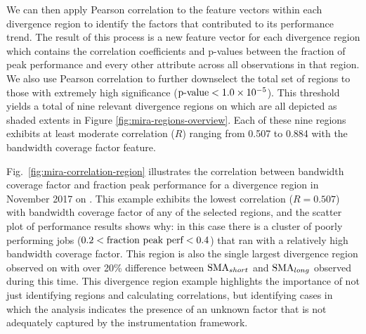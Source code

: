 We can then apply Pearson correlation to the feature vectors within
each divergence region to identify the factors that contributed to its
performance trend.  The result of this process is a new feature vector
for each divergence region which contains the correlation coefficients
and p-values between the fraction of peak performance and every other
attribute across all observations in that region.  We also use Pearson
correlation to further downselect the total set of regions to those 
with extremely high significance
($\textup{p-value} < {1.0 \times 10^{-5}}$).  This threshold yields a total
of nine relevant divergence regions on \mira \mirafsone which are all depicted as shaded extents in Figure \ref{fig:mira-regions-overview}.  Each of these nine
regions exhibits at least moderate correlation ($R$) ranging from 0.507 to
0.884 with the bandwidth coverage factor feature.


Fig.~\ref{fig:mira-correlation-region} illustrates the correlation
between bandwidth coverage factor and fraction peak performance for a
divergence region in November 2017 on \mira \mirafsone.  This example
exhibits the lowest correlation ($R = 0.507$) with bandwidth coverage
factor of any of the selected regions, and the scatter plot of performance
results shows why: in this case there is a cluster of poorly performing
jobs (${0.2 < \textup{fraction peak perf} < 0.4}$) that ran with a
relatively high bandwidth coverage factor.  This region is also the
single largest divergence region observed on \mira with over 20\%
difference between $\textup{SMA}_{short}$ and $\textup{SMA}_{long}$
observed during this time.  This divergence region example highlights the importance of not
just identifying regions and calculating correlations, but identifying cases
in which the analysis indicates the presence of an unknown factor that is
not adequately captured by the instrumentation framework.

